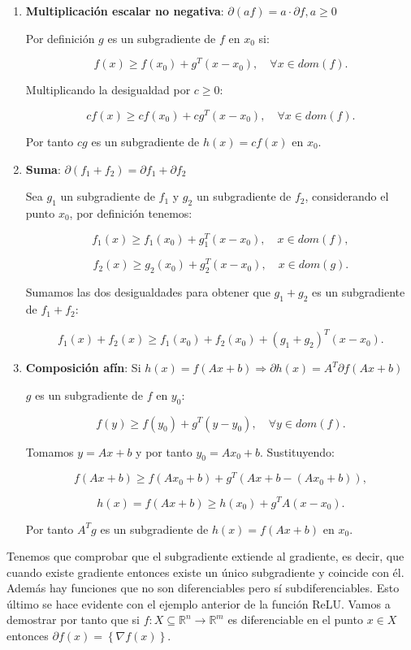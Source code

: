 \begin{enumerate}

	\item{\textbf{Multiplicación escalar no negativa}: $\partial (af) = a \cdot \partial f , a\geq0$
	
	Por definición $g$ es un subgradiente de $f$ en $x_0$ si:
	
	$$f(x) \geq f(x_0) + g^T(x-x_0), \quad \forall x \in dom(f).$$

	Multiplicando la desigualdad por $c \geq 0$:

	$$cf(x) \geq cf(x_0) + cg^T(x-x_0), \quad \forall x \in dom(f).$$

	Por tanto $cg$ es un subgradiente de $h(x)=cf(x)$ en $x_0$.

	}
	
	\item{ \textbf{Suma}: $\partial (f_1+f_2) = \partial f_1 + \partial f_2$

	Sea $g_1$ un subgradiente de $f_1$ y $g_2$ un subgradiente de $f_2$, considerando el punto $x_0$, por definición tenemos:

	$$f_1(x) \geq f_1(x_0) + g_1^T(x-x_0), \quad x \in dom(f),$$

	$$f_2(x) \geq g_2(x_0) + g_2^T(x-x_0), \quad x \in dom(g).$$

	Sumamos las dos desigualdades para obtener que $g_1 + g_2$ es un subgradiente de $f_1 + f_2$:

	$$f_1(x) + f_2(x) \geq f_1(x_0) + f_2(x_0) + \left ( g_1 + g_2 \right ) ^T \left ( x - x_0 \right ).$$


	}
	
	\item{ \textbf{Composición afín}: Si $h(x)=f(Ax + b) \Rightarrow \partial h(x)= A^T \partial f(Ax+b)$
	
	$g$ es un subgradiente de $f$ en $y_0$:
	
	$$f(y) \geq f(y_0) + g^T(y-y_0), \quad \forall y \in dom(f).$$

	Tomamos $y=Ax + b$ y por tanto $y_0= Ax_0 + b$. Sustituyendo:

	$$f(Ax + b) \geq f(Ax_0 + b) + g^T(Ax + b - (Ax_0 + b)),$$

	$$h(x)=f(Ax+b) \geq h(x_0) + g^TA(x-x_0).$$

	Por tanto $A^Tg$ es un subgradiente de $h(x)=f(Ax+b)$ en $x_0$.

	}
	
\end{enumerate}


Tenemos que comprobar que el subgradiente extiende al gradiente, es decir, que cuando existe gradiente entonces existe un único subgradiente y coincide con él. Además hay funciones que no son diferenciables pero sí subdiferenciables. Esto último se hace evidente con el ejemplo anterior de la función ReLU. Vamos a demostrar por tanto que si $f: X \subseteq \mathbb{R}^n \rightarrow \mathbb{R}^m$ es diferenciable en el punto $x\in X$ entonces  $\partial f(x)= \left \{ \nabla f(x) \right \}$.


